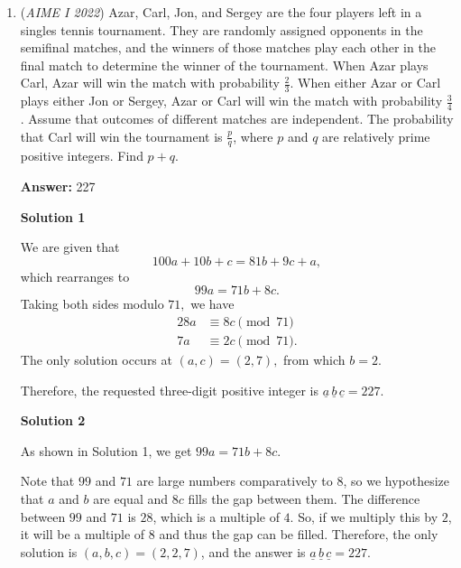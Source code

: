 \begin{enumerate}
 Let $m=a+c$ and $n=b+d$. We then have two equations:
 \begin{align*} 108&=16m+n, \\ 106&=20m+n. \end{align*}
We are trying to solve for $n=P(0)$. Using elimination:
 \begin{align*} 540&=80m+5n, \\ 424&=80m+4n. \end{align*}
Subtracting both equations, we find that $n=\boxed{116}$.

 


	\item (\textit{AIME I 2022}) Azar, Carl, Jon, and Sergey are the four players left in a singles tennis tournament. They are randomly assigned opponents in the semifinal matches, and the winners of those matches play each other in the final match to determine the winner of the tournament. When Azar plays Carl, Azar will win the match with probability $\frac23$. When either Azar or Carl plays either Jon or Sergey, Azar or Carl will win the match with probability $\frac34$. Assume that outcomes of different matches are independent. The probability that Carl will win the tournament is $\frac{p}{q}$, where $p$ and $q$ are relatively prime positive integers. Find $p+q$.


 
 \textbf{Answer: }227



\textbf{Solution 1}

We are given that 
 \[100a + 10b + c = 81b + 9c + a,\] which rearranges to 
 \[99a = 71b + 8c.\]Taking both sides modulo $71,$ we have
 \begin{align*} 28a &\equiv 8c \pmod{71} \\ 7a &\equiv 2c \pmod{71}. \end{align*}
The only solution occurs at $(a,c)=(2,7),$ from which $b=2.$

 Therefore, the requested three-digit positive integer is $\underline{a}\,\underline{b}\,\underline{c}=\boxed{227}.$




\textbf{Solution 2}

As shown in Solution 1, we get $99a = 71b+8c$.

 Note that $99$ and $71$ are large numbers comparatively to $8$, so we hypothesize that $a$ and $b$ are equal and $8c$ fills the gap between them. The difference between $99$ and $71$ is $28$, which is a multiple of $4$. So, if we multiply this by $2$, it will be a multiple of $8$ and thus the gap can be filled. Therefore, the only solution is $(a,b,c)=(2,2,7)$, and the answer is $\underline{a}\,\underline{b}\,\underline{c}=\boxed{227}$.


\end{enumerate}
